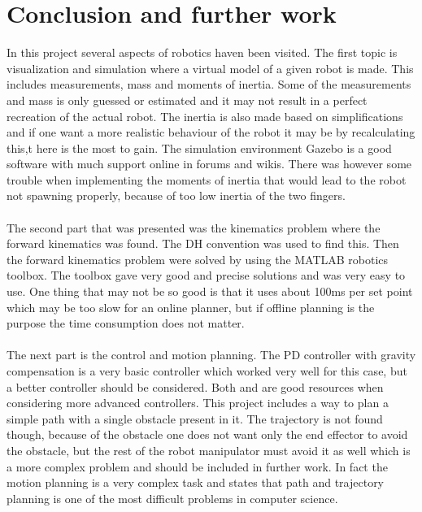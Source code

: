 \chapter{Conclusion and further work}
In this project several aspects of robotics haven been visited. The first topic is visualization and simulation where a virtual model of a given robot is made. This includes measurements, mass and moments of inertia. Some of the measurements and mass is only guessed or estimated and it may not result in a perfect recreation of the actual robot. The inertia is also made based on simplifications and if one want a more realistic behaviour of the robot it may be by recalculating this,t here is the most to gain. The simulation environment Gazebo is a good software with much support online in forums and wikis. There was however some trouble when implementing the moments of inertia that would lead to the robot not spawning properly, because of too low inertia of the two fingers.\\\\
The second part that was presented was the kinematics problem where the forward kinematics was found. The DH convention was used to find this. Then the forward kinematics problem were solved by using the MATLAB robotics toolbox\cite{MatlabRobTool}. The toolbox gave very good and precise solutions and was very easy to use. One thing that may not be so good is that it uses about 100ms per set point which may be too slow for an online planner, but if offline planning is the purpose the time consumption does not matter.
\\\\
The next part is the control and motion planning. The PD controller with gravity compensation is a very basic controller which worked very well for this case, but a better controller should be considered. Both \cite{Siciliano} and \cite{spong} are good resources when considering more advanced controllers. This project includes a way to plan a simple path with a single obstacle present in it. The trajectory is not found though, because of the obstacle one does not want only the end effector to avoid the obstacle, but the rest of the robot manipulator must avoid it as well which is a more complex problem and should be included in further work. In fact the motion planning is a very complex task and \cite{spong} states that path and trajectory planning is one of the most difficult problems in computer science.